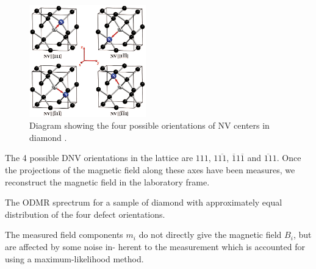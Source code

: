\begin{figure}[h]
    \begin{center}
        \includegraphics[width=0.45\textwidth]{figures/four_possible_NV_orientations.png}
    \end{center}
    \caption{Diagram showing the four possible orientations of NV centers in diamond \cite{pham}.}\label{fig:dnv_orientations}
\end{figure}


The 4 possible DNV orientations in the lattice are $111$, $1\overline{11}$, $\overline{1}1\overline{1}$ and $\overline{11}1$. 
Once the projections of the magnetic field along these axes have been measures, we reconstruct the magnetic field in the laboratory frame.

The ODMR sprectrum for a sample of diamond with approximately equal distribution of the four defect orientations. 

The measured field components $m_i$ do not directly give the magnetic field $B_i$, but are affected by some noise in-
herent to the measurement which is accounted for using a maximum-likelihood method. 


